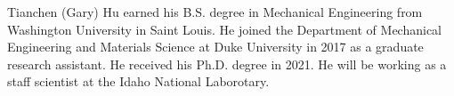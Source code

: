 \biography

Tianchen (Gary) Hu earned his B.S. degree in Mechanical Engineering from Washington University in Saint Louis. He joined the Department of Mechanical Engineering and Materials Science at Duke University in 2017 as a graduate research assistant. He received his Ph.D. degree in 2021. He will be working as a staff scientist at the Idaho National Laborotary.
